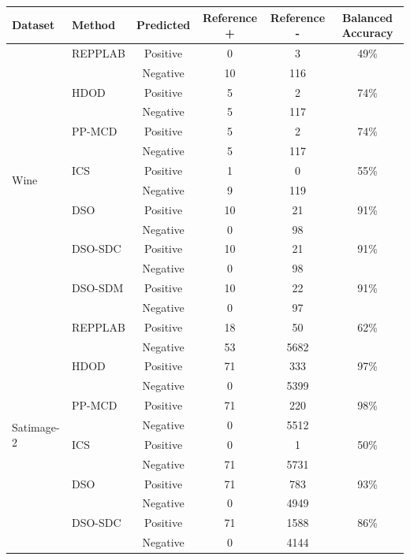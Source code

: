 \documentclass[12pt]{article}
\begin{document}
\begin{table}[!htbp]
\centering
\label{tab:confusion_balacc_realdata}
\small
\begin{tabular}{llcccc}
\toprule
Dataset & Method & Predicted & Reference + & Reference - & Balanced Accuracy \\
\midrule
\multirow{14}{*}{Wine}
 & REPPLAB  & Positive & 0  & 3   & 49\% \\
 &          & Negative & 10 & 116 &      \\
 & HDOD     & Positive & 5  & 2   & 74\% \\
 &          & Negative & 5  & 117 &      \\
 & PP-MCD   & Positive & 5  & 2   & 74\% \\
 &          & Negative & 5  & 117 &      \\
 & ICS      & Positive & 1  & 0   & 55\% \\
 &          & Negative & 9  & 119 &      \\
 & DSO      & Positive & 10 & 21  & 91\% \\
 &          & Negative & 0  & 98  &      \\
 & DSO-SDC  & Positive & 10 & 21  & 91\% \\
 &          & Negative & 0  & 98  &      \\
 & DSO-SDM  & Positive & 10 & 22  & 91\% \\
 &          & Negative & 0  & 97  &      \\
\midrule
\multirow{14}{*}{Satimage-2}
 & REPPLAB  & Positive & 18 & 50   & 62\% \\
 &          & Negative & 53 & 5682 &      \\
 & HDOD     & Positive & 71 & 333  & 97\% \\
 &          & Negative & 0  & 5399 &      \\
 & PP-MCD   & Positive & 71 & 220  & 98\% \\
 &          & Negative & 0  & 5512 &      \\
 & ICS      & Positive & 0  & 1    & 50\% \\
 &          & Negative & 71 & 5731 &      \\
 & DSO      & Positive & 71 & 783  & 93\% \\
 &          & Negative & 0  & 4949 &      \\
 & DSO-SDC  & Positive & 71 & 1588 & 86\% \\
 &          & Negative & 0  & 4144 &      \\

\end{tabular}
\end{table}
\end{document}
